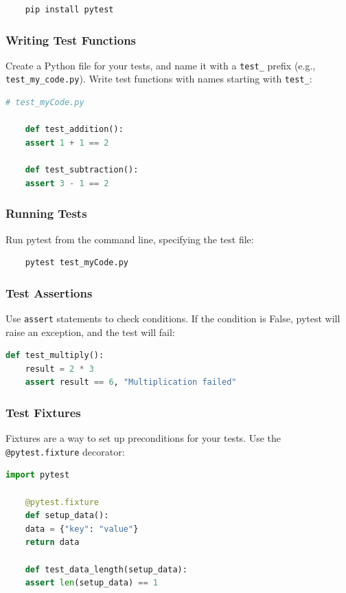 \begin{verbatim}
	pip install pytest
\end{verbatim}

\subsubsection{Writing Test Functions}

Create a Python file for your tests, and name it with a \texttt{test\_} prefix (e.g., \texttt{test\_my\_code.py}). Write test functions with names starting with \texttt{test\_}:

\begin{lstlisting}[language=Python, numbers=none]
	# test_myCode.py
	
	def test_addition():
	assert 1 + 1 == 2
	
	def test_subtraction():
	assert 3 - 1 == 2
\end{lstlisting}

\subsubsection{Running Tests}

Run pytest from the command line, specifying the test file:

\begin{verbatim}
	pytest test_myCode.py
\end{verbatim}


\subsubsection{Test Assertions}

Use \texttt{assert} statements to check conditions. If the condition is False, pytest will raise an exception, and the test will fail:

\begin{lstlisting}[language=Python, numbers=none]
	def test_multiply():
	result = 2 * 3
	assert result == 6, "Multiplication failed"
\end{lstlisting}

\subsubsection{Test Fixtures}

Fixtures are a way to set up preconditions for your tests. Use the \texttt{@pytest.fixture} decorator:

\begin{lstlisting}[language=Python, numbers=none]
	import pytest
	
	@pytest.fixture
	def setup_data():
	data = {"key": "value"}
	return data
	
	def test_data_length(setup_data):
	assert len(setup_data) == 1
\end{lstlisting}

